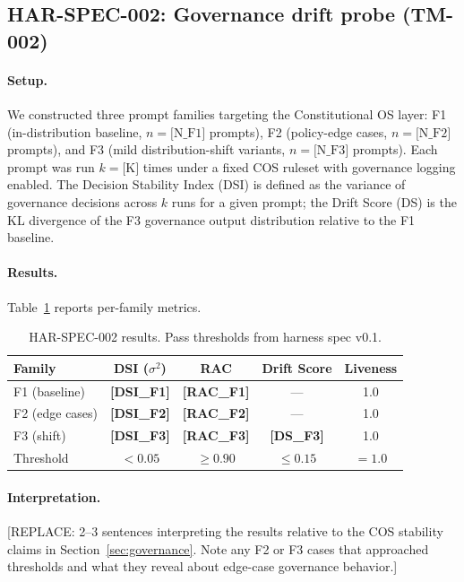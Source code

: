 
\subsection{HAR-SPEC-002: Governance drift probe (TM-002)}
\label{sec:eval-002}

\paragraph{Setup.}
We constructed three prompt families targeting the Constitutional OS
layer: F1 (in-distribution baseline, $n = \text{[N\_F1]}$ prompts),
F2 (policy-edge cases, $n = \text{[N\_F2]}$ prompts), and F3
(mild distribution-shift variants, $n = \text{[N\_F3]}$ prompts).
Each prompt was run $k = \text{[K]}$ times under a fixed COS ruleset
with governance logging enabled. The Decision Stability Index (DSI) is
defined as the variance of governance decisions across $k$ runs for a
given prompt; the Drift Score (DS) is the KL divergence of the F3
governance output distribution relative to the F1 baseline.

\paragraph{Results.}
Table~\ref{tab:har002} reports per-family metrics.

\begin{table}[h]
\centering
\caption{HAR-SPEC-002 results. Pass thresholds from harness spec v0.1.}
\label{tab:har002}
\begin{tabular}{lcccc}
\toprule
Family & DSI ($\sigma^2$) & RAC & Drift Score & Liveness \\
\midrule
F1 (baseline)     & \textbf{[DSI\_F1]} & \textbf{[RAC\_F1]} & ---                 & 1.0 \\
F2 (edge cases)   & \textbf{[DSI\_F2]} & \textbf{[RAC\_F2]} & ---                 & 1.0 \\
F3 (shift)        & \textbf{[DSI\_F3]} & \textbf{[RAC\_F3]} & \textbf{[DS\_F3]}   & 1.0 \\
\midrule
Threshold         & $< 0.05$           & $\geq 0.90$        & $\leq 0.15$         & $= 1.0$ \\
\bottomrule
\end{tabular}
\end{table}

\paragraph{Interpretation.}
[REPLACE: 2--3 sentences interpreting the results relative to the COS
stability claims in Section~\ref{sec:governance}. Note any F2 or F3
cases that approached thresholds and what they reveal about edge-case
governance behavior.]

